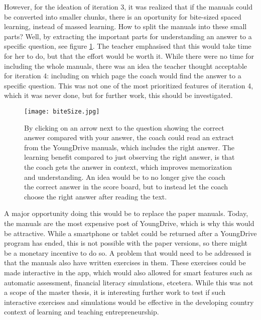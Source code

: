 However, for the ideation of iteration 3, it was realized that if the manuals could be converted into smaller chunks, there is an oportunity for bite-sized spaced learning, instead of massed learning. How to split the manuals into these small parts? Well, by extracting the important parts for understanding an answer to a specific question, see figure \ref{fig:bite-size}. The teacher emphasised that this would take time for her to do, but that the effort would be worth it. While there were no time for including the whole manuals, there was an idea the teacher thought acceptable for iteration 4: including on which page the coach would find the answer to a specific question. This was not one of the most prioritized features of iteration 4, which it was never done, but for further work, this should be investigated.

\begin{figure}[h]
    \centering
    \texttt{[image: biteSize.jpg]}
    \caption{By clicking on an arrow next to the question showing the correct answer compared with your answer, the coach could read an extract from the YoungDrive manuals, which includes the right answer. The learning benefit compared to just observing the right answer, is that the coach gets the answer in context, which improves memorization and understanding. An idea would be to no longer give the coach the correct answer in the score board, but to instead let the coach choose the right answer after reading the text.}
    \label{fig:bite-size}
\end{figure}

A major opportunity doing this would be to replace the paper manuals. Today, the manuals are the most expensive post of YoungDrive, which is why this would be attractive. While a smartphone or tablet could be returned after a YoungDrive program has ended, this is not possible with the paper versions, so there might be a monetary incentive to do so. A problem that would need to be addressed is that the manuals also have written exercises in them. These exercises could be made interactive in the app, which would also allowed for smart features such as automatic assessment, financial literacy simulations, etcetera. While this was not a scope of the master thesis, it is interesting further work to test if such interactive exercises and simulations would be effective in the developing country context of learning and teaching entrepreneurship.
